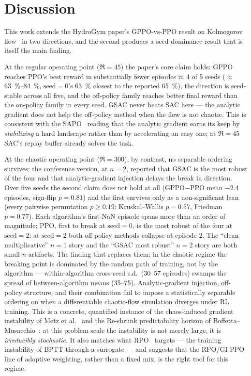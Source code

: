 \section{Discussion}
\label{sec:discussion}

This work extends the HydroGym paper's GPPO-vs-PPO result on Kolmogorov
flow~\cite{hydrogym2026} in two directions, and the second produces a
seed-dominance result that is itself the main finding.

At the regular operating point ($\Re=45$) the paper's core claim holds: GPPO reaches
PPO's best reward in substantially fewer episodes in 4 of 5 seeds
($\approx$\SIrange{63}{84}{\percent}, $\text{seed}=0$'s \SI{63}{\percent}
closest to the reported \SI{65}{\percent}), the direction is seed-stable
across all five, and the off-policy family reaches better final reward than
the on-policy family in every seed. GSAC never beats SAC here --- the
analytic gradient does not help the off-policy method when the flow is not
chaotic. This is consistent with the SAPO~\cite{sapo2025} reading that the
analytic gradient earns its keep by \emph{stabilizing} a hard landscape
rather than by accelerating an easy one; at $\Re=45$ SAC's replay buffer
already solves the task.

At the chaotic operating point ($\Re=300$), by contrast, no separable
ordering survives: the conference version, at $n=2$, reported that GSAC is
the most robust of the four and that analytic-gradient injection delays the
break in direction.
Over five seeds the second claim does not hold at all (GPPO$-$PPO mean
$-2.4$ episodes, sign-flip $p=0.81$) and the first survives only as a
non-significant lean (every pairwise permutation $p\ge 0.19$;
Kruskal--Wallis $p=0.57$, Friedman $p=0.77$). Each algorithm's first-NaN
episode spans more than an order of magnitude; PPO, first to break at
$\text{seed}=0$, is the most robust of the four at $\text{seed}=2$; at
$\text{seed}=2$ both off-policy methods collapse at episode 2. The ``clean
multiplicative'' $n=1$ story and the ``GSAC most robust'' $n=2$ story are
both small-$n$ artifacts. The finding that replaces them: in the
chaotic regime the breaking point is dominated by the random path of
training, not by the algorithm --- within-algorithm cross-seed s.d.\
(30--57 episodes) swamps the spread of between-algorithm means (35--75).
Analytic-gradient injection, off-policy structure, and their combination
fail to impose a statistically separable ordering on when a differentiable
chaotic-flow simulation diverges under RL training. This is a concrete,
quantified instance of the chaos-induced gradient instability of Metz et
al.~\cite{metz2021} and the Re-shrunk predictability horizon of
Boffetta--Musacchio~\cite{boffetta2017}: at this problem scale the
instability is not merely large, it is \emph{irreducibly stochastic}. It
also matches what RPO~\cite{rpo2025} targets --- the training instability of
BPTT-through-a-surrogate --- and suggests that the RPO/GI-PPO line of
adaptive weighting, rather than a fixed mix, is the right tool for this
regime.

